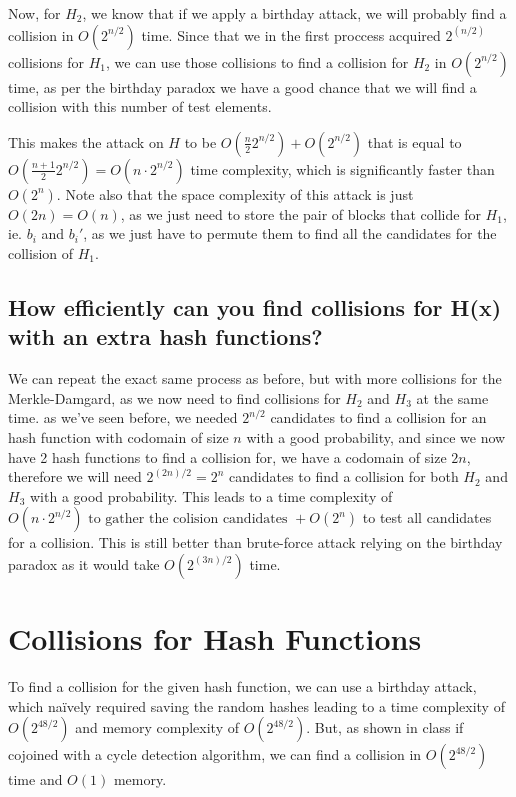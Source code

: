 \documentclass{article}
\begin{document}
Now, for $H_2$, we know that if we apply a birthday attack, we will probably find a collision in $O(2^{n/2})$ time. Since that we in the first proccess acquired $2^{(n/2)}$ collisions for $H_1$, we can use those collisions to find a collision for $H_2$ in $O(2^{n/2})$ time, as per the birthday paradox we have a good chance that we will find a collision with this number of test elements.

This makes the attack on $H$ to be $O(\frac{n}{2} 2^{n/2}) + O(2^{n/2})$ that is equal to $O(\frac{n+1}{2} 2^{n/2}) = O(n \cdot 2^{n/2})$ time complexity, which is significantly faster than $O(2^{n})$. Note also that the space complexity of this attack is just $O(2n) = O(n)$, as we just need to store the pair of blocks that collide for $H_1$, ie. $b_i$ and $b_i'$, as we just have to permute them to find all the candidates for the collision of $H_1$.

\subsection{How efficiently can you find collisions for H(x) with an extra hash functions?}
We can repeat the exact same process as before, but with more collisions for the Merkle-Damgard, as we now need to find collisions for $H_2$ and $H_3$ at the same time.
as we've seen before, we needed $2^{n/2}$ candidates to find a collision for an hash function with codomain of size $n$ with a good probability, and since we now have 2 hash functions to find a collision for, we have a codomain of size $2n$, therefore we will need $2^{(2n)/2} = 2^{n}$ candidates to find a collision for both $H_2$ and $H_3$ with a good probability. This leads to a time complexity of $O(n \cdot 2^{n/2})\text{ to gather the colision candidates } + O(2^{n})$ to test all candidates for a collision. This is still better than brute-force attack relying on the birthday paradox as it would take $O(2^{(3n)/2})$ time.

\section{Collisions for Hash Functions}
To find a collision for the given hash function, we can use a birthday attack, which naïvely required saving the random hashes leading to a time complexity of $O(2^{48/2})$ and memory complexity of $O(2^{48/2})$. But, as shown in class if cojoined with a cycle detection algorithm, we can find a collision in $O(2^{48/2})$ time and $O(1)$ memory.
\end{document}
